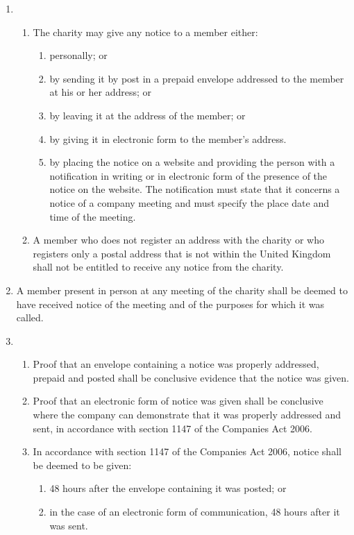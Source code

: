 \begin{enumerate}
\item
  \begin{enumerate}
  \item
    The charity may give any notice to a member either:
    \begin{enumerate}
    \item
      personally; or
    \item
      by sending it by post in a prepaid envelope addressed to the member
      at his or her address; or
    \item
      by leaving it at the address of the member; or
    \item
      by giving it in electronic form to the member's address.
    \item
      by placing the notice on a website and providing the person with a
      notification in writing or in electronic form of the presence of
      the notice on the website. The notification must state that it
      concerns a notice of a company meeting and must specify the place
      date and time of the meeting.
    \end{enumerate}
  \item
    A member who does not register an address with the charity or who
    registers only a postal address that is not within the United
    Kingdom shall not be entitled to receive any notice from the
    charity.
  \end{enumerate}
\item
  A member present in person at any meeting of the charity shall be
  deemed to have received notice of the meeting and of the purposes
  for which it was called.

\item
  \begin{enumerate}
  \item
    Proof that an envelope containing a notice was properly addressed,
    prepaid and posted shall be conclusive evidence that the notice was
    given.
  \item
    Proof that an electronic form of notice was given shall be
    conclusive where the company can demonstrate that it was properly
    addressed and sent, in accordance with section 1147 of the
    Companies Act 2006.
  \item
    In accordance with section 1147 of the Companies Act 2006, notice
    shall be deemed to be given:
    \begin{enumerate}
    \item
      48 hours after the envelope containing it was posted; or
    \item
      in the case of an electronic form of communication, 48 hours after
      it was sent.
    \end{enumerate}
  \end{enumerate}


\end{enumerate}
